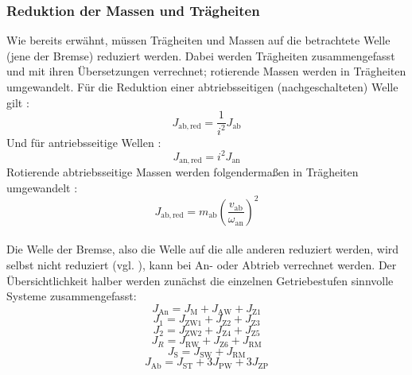 \subsubsection{Reduktion der Massen und Trägheiten}
Wie bereits erwähnt, müssen Trägheiten und Massen auf die betrachtete Welle (jene der Bremse) reduziert werden. Dabei werden Trägheiten zusammengefasst und mit ihren Übersetzungen verrechnet; rotierende Massen werden in Trägheiten umgewandelt. Für die Reduktion einer abtriebsseitigen (nachgeschalteten) Welle gilt \cite[S. 269, Gl. 4.23]{Sauer}: 
\begin{equation}
    J_\mathrm{ab,red} = \frac{1}{i^2} J_\mathrm{ab}
\end{equation}
Und für antriebsseitige Wellen \cite[S. 270, Gl. 4.25]{Sauer}: 
\begin{equation}
    J_\mathrm{an,red} = i^2 J_\mathrm{an}
\end{equation}
Rotierende abtriebsseitige Massen werden folgendermaßen in Trägheiten umgewandelt \cite[S. 270, Gl. 4.28]{Sauer}: 
\begin{equation}
    J_\mathrm{ab,red} = m_\mathrm{ab} \left( \frac{v_\mathrm{ab}}{\omega_\mathrm{an}} \right)^2
\end{equation}\\
Die Welle der Bremse, also die Welle auf die alle anderen reduziert werden, wird selbst nicht reduziert (vgl. \cite[s. 273, Gl. 4.41]{Sauer}), kann bei An- oder Abtrieb verrechnet werden. 
Der Übersichtlichkeit halber werden zunächst die einzelnen Getriebestufen sinnvolle Systeme zusammengefasst:
\begin{equation}
    J_\mathrm{An} = J_\mathrm{M} + J_\mathrm{AW} + J_\mathrm{Z1}
\end{equation}
\begin{equation}
    J_1 = J_\mathrm{ZW1} + J_\mathrm{Z2} + J_\mathrm{Z3}
\end{equation}
\begin{equation}
    J_2 = J_\mathrm{ZW2} + J_\mathrm{Z4} + J_\mathrm{Z5}
\end{equation}
\begin{equation}
    J_R = J_\mathrm{RW} + J_\mathrm{Z6} + J_\mathrm{RM}
\end{equation}
\begin{equation}
    J_\mathrm{S} = J_\mathrm{SW} + J_\mathrm{RM}
\end{equation}
\begin{equation}
    J_\mathrm{Ab} = J_\mathrm{ST} + 3J_\mathrm{PW} + 3J_\mathrm{ZP}
\end{equation}
